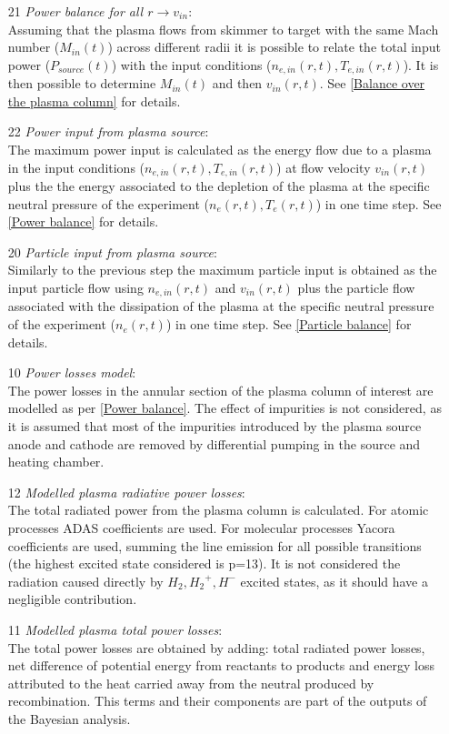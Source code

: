 \begin{enumerate}
    \item[21] \emph{Power balance for all $r \rightarrow v_{in}$}: \\Assuming that the plasma flows from skimmer to target with the same Mach number ($M_{in}(t)$) across different radii it is possible to relate the total input power ($P_{source}(t)$) with the input conditions ($n_{e,in}(r,t), T_{e,in}(r,t)$). It is then possible to determine $M_{in}(t)$ and then $v_{in}(r,t)$. See \autoref{Balance over the plasma column} for details.
    \item[22] \emph{Power input from plasma source}: \\The maximum power input is calculated as the energy flow due to a plasma in the input conditions ($n_{e,in}(r,t), T_{e,in}(r,t)$) at flow velocity $v_{in}(r,t)$ plus the the energy associated to the depletion of the plasma at the specific neutral pressure of the experiment ($n_e(r,t), T_e(r,t)$) in one time step. See \autoref{Power balance} for details.
    \item[20] \emph{Particle input from plasma source}: \\Similarly to the previous step the maximum particle input is obtained as the input particle flow using $n_{e,in}(r,t)$ and $v_{in}(r,t)$ plus the particle flow associated with the dissipation of the plasma at the specific neutral pressure of the experiment ($n_e(r,t)$) in one time step. See \autoref{Particle balance} for details.
    \item[10] \emph{Power losses model}: \\ The power losses in the annular section of the plasma column of interest are modelled as per \autoref{Power balance}. The effect of impurities is not considered, as it is assumed that most of the impurities introduced by the plasma source anode and cathode are removed by differential pumping in the source and heating chamber.
    \item[12] \emph{Modelled plasma radiative power losses}: \\The total radiated power from the plasma column is calculated. For atomic processes ADAS coefficients are used. For molecular processes Yacora coefficients are used, summing the line emission for all possible transitions (the highest excited state considered is p=13). It is not considered the radiation caused directly by $H_2, {H_2}^+, H^-$ excited states, as it should have a negligible contribution.\cite{Groth2019}
    \item[11] \emph{Modelled plasma total power losses}: \\The total power losses are obtained by adding: total radiated power losses, net difference of potential energy from reactants to products and energy loss attributed to the heat carried away from the neutral produced by recombination. This terms and their components are part of the outputs of the Bayesian analysis.

\end{enumerate}
